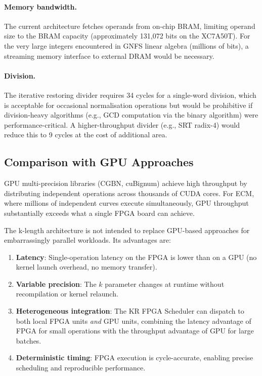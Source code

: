 \documentclass[11pt,a4paper]{article}
\begin{document}
\paragraph{Memory bandwidth.}
The current architecture fetches operands from on-chip BRAM, limiting
operand size to the BRAM capacity (approximately 131,072 bits on the XC7A50T).
For the very large integers encountered in GNFS linear algebra (millions of
bits), a streaming memory interface to external DRAM would be necessary.

\paragraph{Division.}
The iterative restoring divider requires 34 cycles for a single-word
division, which is acceptable for occasional normalisation operations but
would be prohibitive if division-heavy algorithms (e.g., GCD computation
via the binary algorithm) were performance-critical.  A higher-throughput
divider (e.g., SRT radix-4) would reduce this to 9 cycles at the cost of
additional area.

\subsection{Comparison with GPU Approaches}
\label{sec:gpu-comparison}

GPU multi-precision libraries (CGBN, cuBignum) achieve high throughput by
distributing independent operations across thousands of CUDA cores.  For
ECM, where millions of independent curves execute simultaneously, GPU
throughput substantially exceeds what a single FPGA board can achieve.

The k-length architecture is not intended to replace GPU-based approaches
for embarrassingly parallel workloads.  Its advantages are:

\begin{enumerate}[leftmargin=*]
  \item \textbf{Latency}: Single-operation latency on the FPGA is lower
    than on a GPU (no kernel launch overhead, no memory transfer).

  \item \textbf{Variable precision}: The $k$ parameter changes at runtime
    without recompilation or kernel relaunch.

  \item \textbf{Heterogeneous integration}: The KR FPGA Scheduler can
    dispatch to both local FPGA units \emph{and} GPU units, combining the
    latency advantage of FPGA for small operations with the throughput
    advantage of GPU for large batches.

  \item \textbf{Deterministic timing}: FPGA execution is cycle-accurate,
    enabling precise scheduling and reproducible performance.
\end{enumerate}
\end{document}
